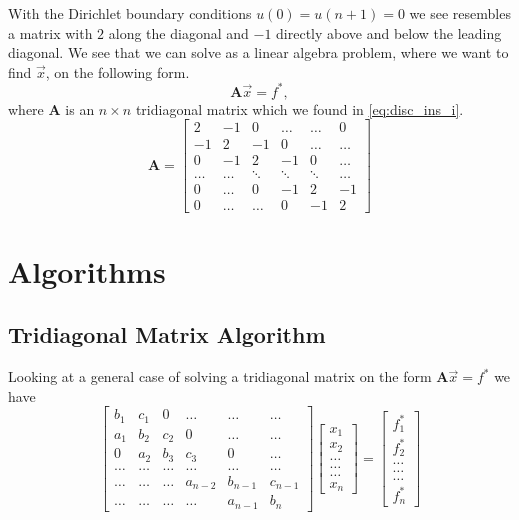 \documentclass[10pt, a4paper]{amsart}
\begin{document}
With the Dirichlet boundary conditions $u(0) = u(n+1) = 0$ we see resembles a matrix with $2$ along the diagonal and $-1$ directly above and below the leading diagonal. We see that we can solve as a linear algebra problem, where we want to find $\vec{x}$, on the following form. 
\begin{equation}
\mathbf{A}\vec{x} = f^*, \nonumber
\end{equation}
where $\mathbf{A}$ is an $n\times n$ tridiagonal matrix which we found in \ref{eq:disc_ins_i}.
\begin{equation}\label{mat:tridiag_1_n}
\mathbf{A} = 
\begin{bmatrix}
2 & -1 & 0 & \dots & \dots & 0 \\
-1 & 2 & -1 & 0 & \dots & \dots \\
0 & -1 & 2 & -1 & 0 & \dots \\
\dots & \dots & \ddots & \ddots & \ddots & \dots\\
0 & \dots & 0 & -1 & 2 & -1 \\
0 & \dots & \dots & 0 & -1 & 2
\end{bmatrix}
\end{equation}

\section{Algorithms} 
\subsection{Tridiagonal Matrix Algorithm}
Looking at a general case of solving a tridiagonal matrix on the form $\mathbf{A}\vec{x} = f^*$ we have 
\begin{equation} 
	\begin{bmatrix}
		b_1 & c_1 & 0 &\dots &\dots &\dots \\
		a_1 & b_2 & c_2 & 0 &\dots &\dots\\
		0 & a_2 & b_3 & c_3 & 0 &\dots \\
		\dots &\dots &\dots &\dots &\dots &\dots\\
		\dots &\dots &\dots & a_{n-2} & b_{n-1} & c_{n-1} \\
		\dots &\dots &\dots &\dots &a_{n-1} & b_n
	\end{bmatrix}
	\begin{bmatrix}
		x_1 \\
		x_2 \\
		\dots \\
		\dots \\
		\dots \\
		x_n
	\end{bmatrix} 
	= 
	\begin{bmatrix}
		f^*_1\\
		f^*_2\\
		\dots \\
		\dots \\
		\dots \\
		f^*_n
	\end{bmatrix}
\end{equation}
\end{document}
